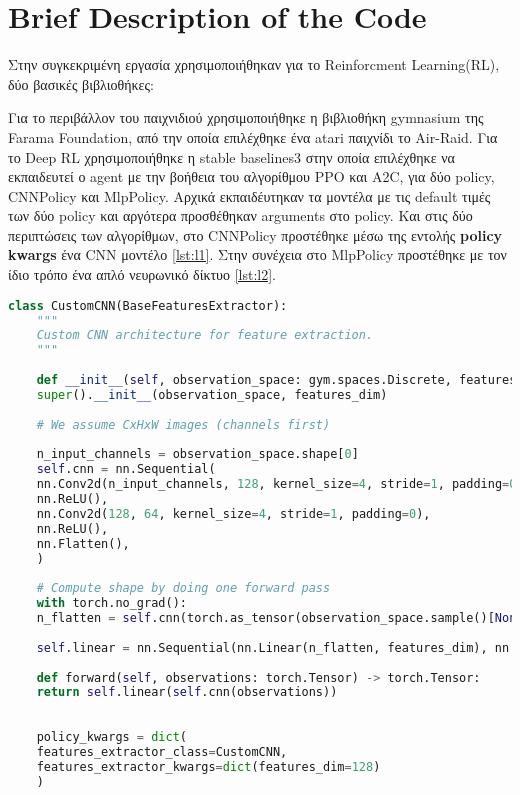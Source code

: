 \section{Brief Description of the Code}

Στην συγκεκριμένη εργασία χρησιμοποιήθηκαν για το Reinforcment Learning(RL), δύο βασικές βιβλιοθήκες: 

Για το περιβάλλον του παιχνιδιού χρησιμοποιήθηκε η βιβλιοθήκη gymnasium της Farama Foundation, από την οποία επιλέχθηκε ένα atari παιχνίδι το 
Air-Raid.
Για το Deep RL χρησιμοποιήθηκε η stable baselines3 στην οποία επιλέχθηκε να εκπαιδευτεί ο agent με την βοήθεια του αλγορίθμου PPO και A2C, για
δύο policy, CNNPolicy και MlpPolicy. Αρχικά εκπαιδέυτηκαν τα μοντέλα με τις default τιμές των δύο policy και αργότερα προσθέθηκαν arguments στο policy. Και στις δύο περιπτώσεις των αλγορίθμων, στο CNNPolicy προστέθηκε μέσω της εντολής \textbf{policy kwargs} ένα CNN μοντέλο \ref{lst:l1}. Στην συνέχεια στο MlpPolicy προστέθηκε με τον ίδιο τρόπο ένα απλό νευρωνικό δίκτυο \ref{lst:l2}.




\begin{lstlisting}[language=Python, caption=CNN Network,label={lst:l1}]
	class CustomCNN(BaseFeaturesExtractor):
	"""
	Custom CNN architecture for feature extraction.
	"""
	
	def __init__(self, observation_space: gym.spaces.Discrete, features_dim: int = 128):
	super().__init__(observation_space, features_dim)
	
	# We assume CxHxW images (channels first)
	
	n_input_channels = observation_space.shape[0]
	self.cnn = nn.Sequential(
	nn.Conv2d(n_input_channels, 128, kernel_size=4, stride=1, padding=0),
	nn.ReLU(),
	nn.Conv2d(128, 64, kernel_size=4, stride=1, padding=0),
	nn.ReLU(),
	nn.Flatten(),
	)
	
	# Compute shape by doing one forward pass
	with torch.no_grad():
	n_flatten = self.cnn(torch.as_tensor(observation_space.sample()[None]).float()).shape[1]
	
	self.linear = nn.Sequential(nn.Linear(n_flatten, features_dim), nn.ReLU())
	
	def forward(self, observations: torch.Tensor) -> torch.Tensor:
	return self.linear(self.cnn(observations))
	
	
	policy_kwargs = dict(
	features_extractor_class=CustomCNN,
	features_extractor_kwargs=dict(features_dim=128)
	)
	
\end{lstlisting}


